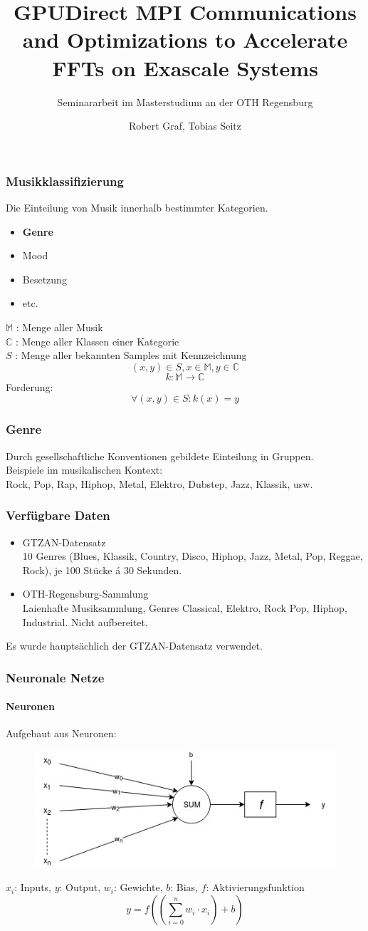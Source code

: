 \documentclass{beamer}
\title{GPUDirect MPI Communications and Optimizations to Accelerate FFTs on Exascale Systems}
\subtitle{Seminararbeit im Masterstudium an der OTH Regensburg}
\author{Robert Graf, Tobias Seitz}
\begin{document}
\frame
{
	\titlepage
}




\frame
{
	
	\frametitle{Musikklassifizierung}
	Die Einteilung von Musik innerhalb bestimmter Kategorien.
	\begin{itemize}
		\item \textbf{Genre}
		\item Mood
		\item Besetzung
		\item etc.
	\end{itemize}
$\mathbb{M}$ : Menge aller Musik \\
$\mathbb{C}$ : Menge aller Klassen einer Kategorie\\
$S$ : Menge aller bekannten Samples mit Kennzeichnung 
$$(x,y) \in S, x \in \mathbb{M}, y \in \mathbb{C}$$
$$k : \mathbb{M} \rightarrow \mathbb{C}$$
Forderung:
$$\forall (x,y) \in S : k(x) = y$$

}
\frame
{
	\frametitle{Genre}
	Durch gesellschaftliche Konventionen gebildete Einteilung in Gruppen.\\
	Beispiele im musikalischen Kontext:\\
	Rock, Pop, Rap, Hiphop, Metal, Elektro, Dubstep, Jazz, Klassik, usw.
}

\frame
{
	\frametitle{Verfügbare Daten}
	\begin{itemize}
		\item GTZAN-Datensatz\\
			10 Genres (Blues, Klassik, Country, Disco, Hiphop, Jazz, Metal, Pop, Reggae, Rock), je 100 Stücke á 30 Sekunden.
		\item OTH-Regensburg-Sammlung\\
			Laienhafte Musiksammlung, Genres Classical, Elektro, Rock Pop, Hiphop, Industrial. Nicht aufbereitet.
	\end{itemize}
	Es wurde hauptsächlich der GTZAN-Datensatz verwendet.
}

\frame
{
	\frametitle{Neuronale Netze}
	\framesubtitle{Neuronen}
	Aufgebaut aus Neuronen:
 	\begin{figure}[h!]
		\centering
		\includegraphics[width=0.8\linewidth,height=0.8\textheight, keepaspectratio]{res/old/neuron.jpg}
	\end{figure}
	$x_i$: Inputs, $y$: Output, $w_i$: Gewichte, $b$: Bias, $f$: Aktivierungsfunktion
	$$y = f((\sum_{i=0}^{n}{w_i \cdot x_i}) + b)$$
}
\end{document}
